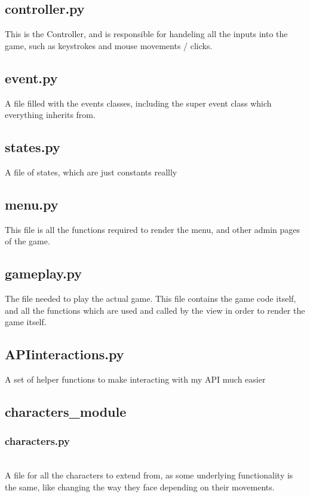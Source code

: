 \subsection{controller.py}
This is the Controller, and is responsible for handeling all the inputs into the game, such as keystrokes and mouse movements / clicks. 


\subsection{event.py}
A file filled with the events classes, including the super event class which everything inherits from.


\subsection{states.py}
A file of states, which are just constants reallly


\subsection{menu.py}
This file is all the functions required to render the menu, and other admin pages of the game.


\subsection{gameplay.py}
The file needed to play the actual game. This file contains the game code itself, and all the functions which are used and called by the view in order to render the game itself.


\subsection{APIinteractions.py}
A set of helper functions to make interacting with my API much easier


\subsection{characters\_module}
\subsubsection{characters.py}\\
A file for all the characters to extend from, as some underlying functionality is the same, like changing the way they face depending on their movements.


